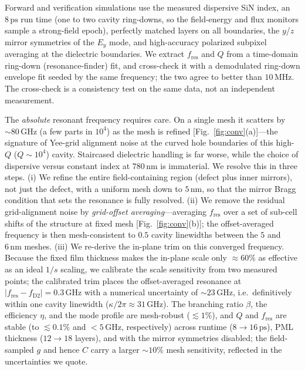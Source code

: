 \documentclass[%
 reprint,
 amsmath,amssymb,
 aps,prx,
 superscriptaddress,
]{revtex4-2}
\newcommand{\unit}[1]{\,\mathrm{#1}}
\begin{document}
Forward and verification simulations use the measured dispersive SiN index, an
$8\unit{ps}$ run time (one to two cavity ring-downs, so the field-energy and flux
monitors sample a strong-field epoch), perfectly matched layers on all boundaries,
the $y$/$z$ mirror symmetries of the $E_y$ mode, and high-accuracy polarized
subpixel averaging at the dielectric boundaries. We extract $f_\mathrm{res}$ and
$Q$ from a time-domain ring-down (resonance-finder) fit, and cross-check it with a
demodulated ring-down envelope fit seeded by the same frequency; the two agree to
better than $10\unit{MHz}$. The cross-check is a consistency test on the same data,
not an independent measurement.

The \emph{absolute} resonant frequency requires care. On a single mesh it scatters
by $\sim\!80\unit{GHz}$ (a few parts in $10^4$) as the mesh is refined
[Fig.~\ref{fig:conv}(a)]---the signature of Yee-grid alignment noise at the curved
hole boundaries of this high-$Q$ ($Q\sim10^4$) cavity. Staircased dielectric handling is far worse, while
the choice of dispersive versus constant index at $780\unit{nm}$ is immaterial. We
resolve this in three steps. (i) We refine the entire field-containing region
(defect plus inner mirrors), not just the defect, with a uniform mesh down to
$5\unit{nm}$, so that the mirror Bragg condition that sets the resonance is fully
resolved. (ii) We remove the residual grid-alignment noise by \emph{grid-offset
averaging}---averaging $f_\mathrm{res}$ over a set of sub-cell shifts of the
structure at fixed mesh [Fig.~\ref{fig:conv}(b)]; the offset-averaged frequency is
then mesh-consistent to $0.5$ cavity linewidths between the $5$ and $6\unit{nm}$
meshes. (iii) We re-derive
the in-plane trim on this converged frequency. Because the fixed film thickness
makes the in-plane scale only $\approx\!60\%$ as effective as an ideal $1/s$
scaling, we calibrate the scale sensitivity from two measured points; the
calibrated trim places the offset-averaged resonance at
$|f_\mathrm{res}-f_\mathrm{D2}|=0.3\unit{GHz}$ with a numerical uncertainty of
$\sim\!23\unit{GHz}$, i.e.\ definitively within one cavity linewidth
($\kappa/2\pi\approx31\unit{GHz}$). The branching ratio $\beta$, the efficiency
$\eta$, and the mode profile are mesh-robust ($\lesssim1\%$), and $Q$ and
$f_\mathrm{res}$ are stable (to $\lesssim0.1\%$ and $<5\unit{GHz}$, respectively)
across runtime ($8\!\to\!16\unit{ps}$), PML thickness ($12\!\to\!18$ layers), and
with the mirror symmetries disabled; the field-sampled $g$ and hence $C$ carry a
larger $\sim\!10\%$ mesh sensitivity, reflected in the uncertainties we quote.
\end{document}
